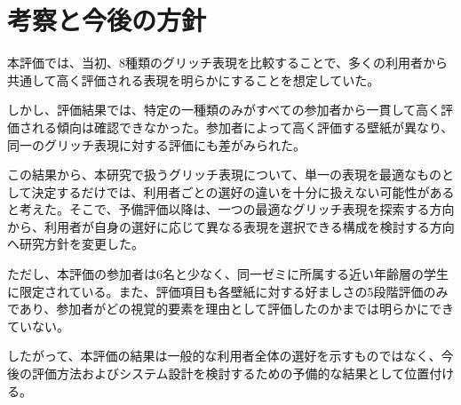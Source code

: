 \section{考察と今後の方針}

本評価では、当初、8種類のグリッチ表現を比較することで、多くの利用者から共通して高く評価される表現を明らかにすることを想定していた。

しかし、評価結果では、特定の一種類のみがすべての参加者から一貫して高く評価される傾向は確認できなかった。参加者によって高く評価する壁紙が異なり、同一のグリッチ表現に対する評価にも差がみられた。

この結果から、本研究で扱うグリッチ表現について、単一の表現を最適なものとして決定するだけでは、利用者ごとの選好の違いを十分に扱えない可能性があると考えた。そこで、予備評価以降は、一つの最適なグリッチ表現を探索する方向から、利用者が自身の選好に応じて異なる表現を選択できる構成を検討する方向へ研究方針を変更した。

ただし、本評価の参加者は6名と少なく、同一ゼミに所属する近い年齢層の学生に限定されている。また、評価項目も各壁紙に対する好ましさの5段階評価のみであり、参加者がどの視覚的要素を理由として評価したのかまでは明らかにできていない。

したがって、本評価の結果は一般的な利用者全体の選好を示すものではなく、今後の評価方法およびシステム設計を検討するための予備的な結果として位置付ける。